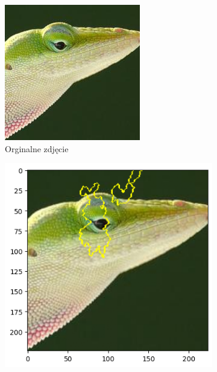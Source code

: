 \begin{figure}[h]
	\centering
	\begin{subfigure}[b]{0.3\textwidth}
		\includegraphics[width=.9\textwidth]{img/examples/appendix/n01682714_14308}
		\caption{Orginalne zdjęcie}  \label{}
	\end{subfigure}
	\begin{subfigure}[b]{0.3\textwidth}
		\centering\includegraphics[width=.9\textwidth]{img/examples/appendix/n01682714_14308_lime}

\end{subfigure}
\end{figure}

